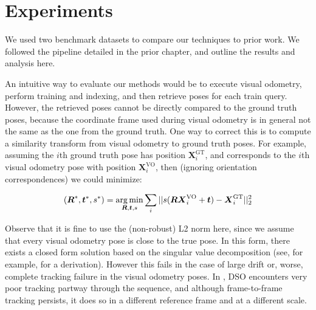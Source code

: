 \chapter{Experiments}

We used two benchmark datasets to compare our techniques to prior work. We followed the pipeline detailed in the prior chapter, and outline the results and analysis here.

An intuitive way to evaluate our methods would be to execute visual odometry, perform training and indexing, and then retrieve poses for each train query. However, the retrieved poses cannot be directly compared to the ground truth poses, because the coordinate frame used during visual odometry is in general not the same as the one from the ground truth. One way to correct this is to compute a similarity transform from visual odometry to ground truth poses. For example, assuming the $i$th ground truth pose has position $\boldsymbol{X}^{\text{GT}}_i$, and corresponds to the $i$th visual odometry pose with position $\boldsymbol{X}^{\text{VO}}_i$, then (ignoring orientation correspondences) we could minimize:

\begin{equation}
(\boldsymbol{R}^*, \boldsymbol{t}^*, s^*) = \operatorname*{arg\,min}_{\boldsymbol{R}, \boldsymbol{t}, s} \sum_i || s(\boldsymbol{R} \boldsymbol{X}^{\text{VO}}_i + \boldsymbol{t}) - \boldsymbol{X}^{\text{GT}}_i||_2^2
\end{equation}

Observe that it is fine to use the (non-robust) L2 norm here, since we assume that every visual odometry pose is close to the true pose. In this form, there exists a closed form solution based on the singular value decomposition (see, for example, \cite{umeyama1991least} for a derivation). However this fails in the case of large drift or, worse, complete tracking failure in the visual odometry poses. In , DSO encounters very poor tracking partway through the sequence, and although frame-to-frame tracking persists, it does so in a different reference frame and at a different scale.

